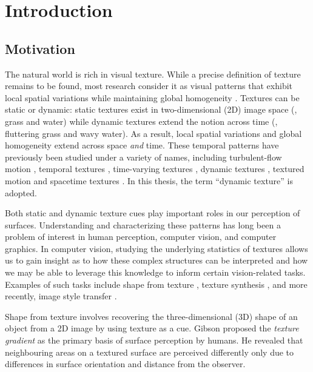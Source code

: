 \chapter{Introduction }

\section{Motivation}

The natural world is rich in visual texture. While a precise definition of 
texture remains to be found, most research consider it as visual patterns that 
exhibit local spatial variations while maintaining global homogeneity . Textures 
can be static or dynamic: static textures exist in two-dimensional (2D) image space 
(\eg, grass and water) while dynamic textures extend the notion across time (\eg, 
fluttering grass and wavy water). As a result, local spatial variations and 
global homogeneity extend across space \emph{and} time. These temporal patterns 
have previously been studied under a variety of names, including turbulent-flow 
motion \cite{heeger1986}, temporal textures \cite{nelson1992}, time-varying 
textures \cite{bar-joseph2001}, dynamic textures \cite{doretto2003}, textured 
motion \cite{wang2003} and spacetime textures \cite{derpanis2012spacetime}.
In this thesis, the term ``dynamic texture'' is adopted. 

Both static and dynamic texture cues play important roles in our perception of 
surfaces. Understanding and characterizing these patterns has long been a problem 
of interest in human perception, computer vision, and computer graphics. In 
computer vision, studying the underlying statistics of textures allows us to gain 
insight as to how these complex structures can be interpreted and how we may be 
able to leverage this knowledge to inform certain vision-related tasks. Examples 
of such tasks include shape from texture \cite{gibson1950perception}, texture 
synthesis \cite{heeger1995pyramid}, and more recently, image style transfer 
\cite{gatys2016image}.

Shape from texture involves recovering the
three-dimensional (3D) shape of an object from a 2D image by using texture as a 
cue. Gibson \cite{gibson1950perception} proposed the \emph{texture gradient} as 
the primary basis of surface perception by humans. He revealed that neighbouring areas on a textured surface are perceived differently only due to differences
in surface orientation and distance from the observer.

